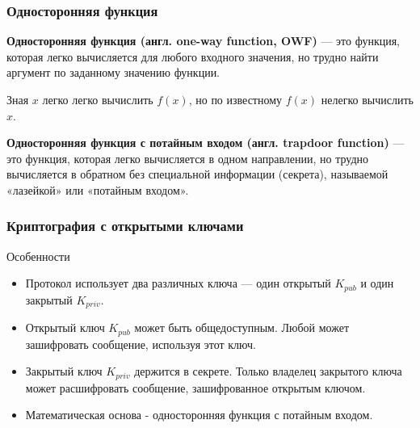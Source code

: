 \documentclass{beamer}
\newcommand{\define}[2]{{\bf #1} --- #2.\vspace{1em}}
\begin{document}
\begin{frame}
  \frametitle{Односторонняя функция}
  \define{Односторонняя функция (англ. one-way function, OWF)} {это функция, которая легко вычисляется для
         любого входного значения, но трудно найти аргумент по заданному значению функции}

  Зная $x$ легко легко вычислить $f(x)$, но по известному $f(x)$ нелегко вычислить $x$.

  \vspace{1\baselineskip}

  \define{Односторонняя функция с потайным входом (англ. trapdoor function)} {это функция, которая легко вычисляется
  в одном направлении, но трудно вычисляется в обратном без специальной информации (секрета), называемой «лазейкой» или «потайным входом»}
\end{frame}

\begin{frame}
  \frametitle{Криптография с открытыми ключами}
  \begin{block}{Особенности}
    \begin{itemize}
      \item{Протокол использует два различных ключа --- один открытый $K_{pub}$ и один закрытый $K_{priv}$.}
      \item{Открытый ключ $K_{pub}$ может быть общедоступным. Любой может зашифровать сообщение, используя этот ключ.}
      \item{Закрытый ключ $K_{priv}$ держится в секрете. Только владелец закрытого ключа может расшифровать
        сообщение, зашифрованное открытым ключом.}
      \item{Математическая основа - односторонняя функция с потайным входом.}
    \end{itemize}
  \end{block}
\end{frame}
\end{document}
